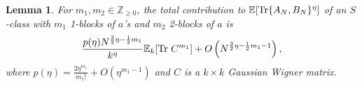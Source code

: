 \documentclass[11pt,reqno]{amsart}
\numberwithin{equation}{section}
\theoremstyle{plain}
\newtheorem{definition}[thm]{Definition}
\newtheorem{lemma}[thm]{Lemma}
\newcommand{\Z}{\ensuremath{\mathbb{Z}}}
\begin{document}





\begin{lemma}\label{Sclasscontribution} For $m_1, m_2\in \Z_{\geq 0}$, the total contribution to $\mathbb{E}[\textup{Tr}\{A_N, B_N\}^\eta]$ of an $S$-class with $m_1$ 1-blocks of $a$'s and $m_2$ 2-blocks of $a$ is
\begin{align}
\frac{p(\eta)N^{\frac{3}{2}\eta -\frac{1}{2}m_1}}{k^{\eta}}\mathbb{E}_k[\textup{Tr }C^{m_1}]+O\left(N^{\frac{3}{2}\eta -\frac{1}{2}m_1-1}\right),
\end{align}
where $p(\eta)=\frac{2\eta^{m_1}}{m_1!}+O(\eta^{m_1-1})$ and $C$ is a $k\times k$ Gaussian Wigner matrix.
\end{lemma}
\end{document}
